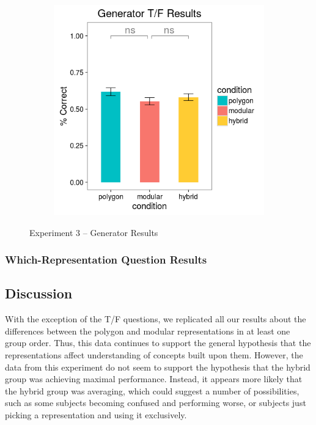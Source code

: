 \documentclass[11pt]{article}
\begin{document}
\begin{figure}[H]
\begin{subfigure}[c]{0.4\textwidth}
\includegraphics[width=\textwidth]{figures/3/gen_TF_r.png}
\end{subfigure}
\caption{Experiment 3 -- Generator Results}
\label{ex3_gen}
\end{figure}\noindent 
\subsubsection{Which-Representation Question Results}
\subsection{Discussion}
With the exception of the T/F questions, we replicated all our results about the differences between the polygon and modular representations in at least one group order. Thus, this data continues to support the general hypothesis that the representations affect understanding of concepts built upon them. However, the data from this experiment do not seem to support the hypothesis that the hybrid group was achieving maximal performance. Instead, it appears more likely that the hybrid group was averaging, which could suggest a  number of possibilities, such as some subjects becoming confused and performing worse, or subjects just picking a representation and using it exclusively. 
\end{document}

